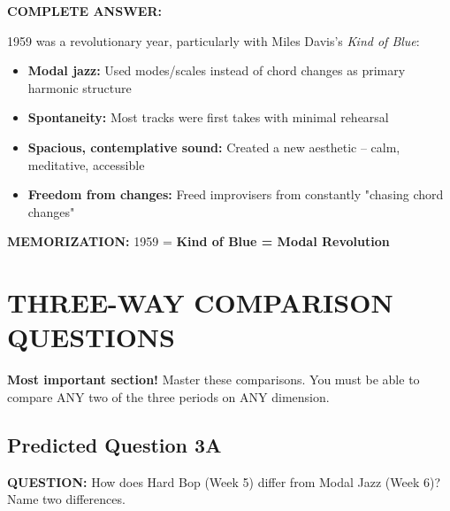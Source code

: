 \documentclass[11pt]{article}
\begin{document}
\begin{mdframed}[backgroundcolor=answercolor!10, linewidth=2pt]
\textbf{\textcolor{answercolor}{COMPLETE ANSWER:}}

1959 was a revolutionary year, particularly with Miles Davis's \textit{Kind of Blue}:

\begin{itemize}[leftmargin=*, nosep]
    \item \textbf{Modal jazz:} Used modes/scales instead of chord changes as primary harmonic structure
    \item \textbf{Spontaneity:} Most tracks were first takes with minimal rehearsal
    \item \textbf{Spacious, contemplative sound:} Created a new aesthetic – calm, meditative, accessible
    \item \textbf{Freedom from changes:} Freed improvisers from constantly "chasing chord changes"
\end{itemize}

\vspace{5pt}
\end{mdframed}

\textbf{MEMORIZATION:} 1959 = \textbf{\textcolor{modal}{Kind of Blue = Modal Revolution}}

\newpage

\section{THREE-WAY COMPARISON QUESTIONS}

\begin{tcolorbox}[colback=red!5!white, colframe=red!75!black, title=\textbf{CRITICAL SECTION – 30\% OF QUIZ}]
\textbf{Most important section!} Master these comparisons. You must be able to compare ANY two of the three periods on ANY dimension.
\end{tcolorbox}

\subsection*{Predicted Question 3A}

\begin{mdframed}[backgroundcolor=questioncolor!10, linewidth=2pt]
\textbf{\textcolor{questioncolor}{QUESTION:}} How does Hard Bop (Week 5) differ from Modal Jazz (Week 6)? Name two differences.
\end{mdframed}
\end{document}
